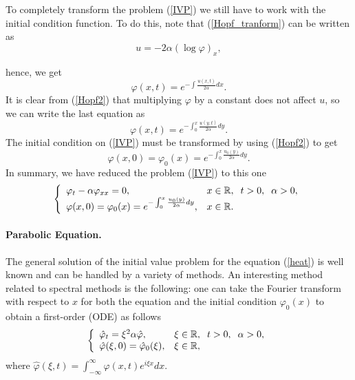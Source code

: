     \noindent To completely transform the problem (\ref{IVP}) we still have to work with the initial condition function. To do this, note that (\ref{Hopf_tranform}) can be written as
    \begin{equation}
        u = -2 \alpha (\log \varphi)_x,
        \label{Hopf2}
    \end{equation}
    
    \noindent hence, we get
    \begin{equation*}
        \varphi (x, t) = \displaystyle e^{- \int \frac{u(x, t)}{2 \alpha} dx}.
    \end{equation*}
    It is clear from (\ref{Hopf2}) that multiplying $\varphi$ by a constant does not affect $u$, so we can write the last equation as
    \begin{equation}
        \varphi (x, t) = \displaystyle e^{- \int_{0}^{x} \frac{u(y, t)}{2 \alpha} dy}.
        \label{phi}
    \end{equation}
    The initial condition on (\ref{IVP}) must be transformed by using (\ref{Hopf2}) to get
    \begin{equation*}
        \varphi (x, 0) = \varphi_0 (x) = \displaystyle e^{- \int_{0}^{x} \frac{u_0 (y)}{2 \alpha} dy}.
    \end{equation*}
    In summary, we have reduced the problem (\ref{IVP}) to this one
    \begin{equation}
        \left \lbrace \begin{array}{ll}
    	\varphi_t - \alpha \varphi_{xx} = 0,  & x \in \mathbb{R}, \hspace{2mm} t > 0, \hspace{2mm} \alpha > 0, \\
    	\varphi (x, 0) = \varphi_0 (x) = \displaystyle e^{- \int_{0}^{x} \frac{u_0 (y)}{2 \alpha} dy}, & x \in \mathbb{R}.
    	\end{array}  \right .
    \label{heat}
    \end{equation}
    \paragraph{Parabolic Equation.} The general solution of the initial value problem for the equation (\ref{heat}) is well known and can be handled by a variety of methods. An interesting method related to spectral methods is the following: one can take the Fourier transform with respect to $x$ for both the equation and the initial condition $\varphi_0 (x)$ to obtain a first-order (ODE) as follows
    \begin{equation*}
        \left \lbrace \begin{array}{ll}
    	\hat{\varphi}_t = \xi^2 \alpha \hat{\varphi},  & \xi \in \mathbb{R}, \hspace{2mm} t > 0, \hspace{2mm} \alpha > 0, \\
    	\hat{\varphi} (\xi, 0) = \hat{\varphi}_0 (\xi), & \xi \in \mathbb{R},
    	\end{array}  \right .
    \end{equation*}
    where $\hat{\varphi} (\xi, t) = \displaystyle \int_{-\infty}^{\infty} \varphi (x, t) e^{i \xi x} dx $. \\
    
